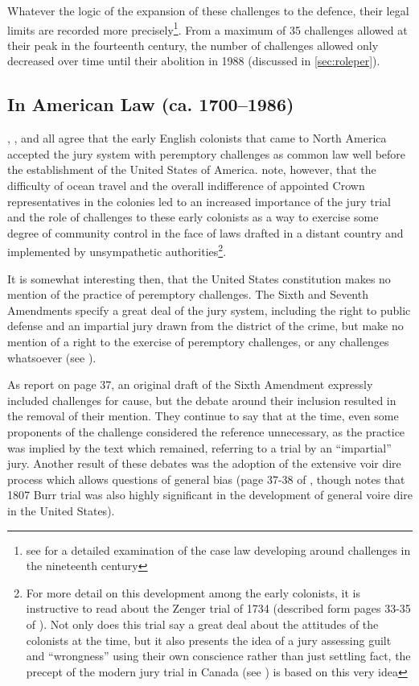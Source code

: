 Whatever the logic of the expansion of these challenges to the defence, their legal limits are recorded more
precisely\footnote{see \cite{brown2000} for a detailed examination of the case law developing around challenges in the nineteenth
  century}. From a maximum of 35 challenges allowed at their peak in the fourteenth century, the number of challenges allowed only
decreased over time until their abolition in 1988 (discussed in \ref{sec:roleper}).

\subsection{In American Law (ca. 1700--1986)}

\cite{vonmosch1921}, \cite{hoffman1997}, and \cite{vandykejurysel} all agree that the early English colonists that came to North
America accepted the jury system with peremptory challenges as common law well before the establishment of the United States of
America. \cite{hansvidjudging} note, however, that the difficulty of ocean travel and the overall indifference of appointed Crown
representatives in the colonies led to an increased importance of the jury trial and the role of challenges to these early
colonists as a way to exercise some degree of community control in the face of laws drafted in a distant country and implemented
by unsympathetic authorities\footnote{For more detail on this development among the early colonists, it is instructive to read
  about the Zenger trial of 1734 (described form pages 33-35 of \cite{hansvidjudging}). Not only does this trial say a great deal
  about the attitudes of the colonists at the time, but it also presents the idea of a jury assessing guilt and ``wrongness''
  using their own conscience rather than just settling fact, the precept of the modern jury trial in Canada (see
  \cite{woolley2018}) is based on this very idea}.

It is somewhat interesting then, that the United States constitution makes no mention of the practice of peremptory
challenges. The Sixth and Seventh Amendments specify a great deal of the jury system, including the right to public defense and an
impartial jury drawn from the district of the crime, but make no mention of a right to the exercise of peremptory challenges, or
any challenges whatsoever (see \cite{usconstitution}).

As \cite{hansvidjudging} report on page 37, an original draft of the Sixth Amendment expressly included challenges for cause, but
the debate around their inclusion resulted in the removal of their mention. They continue to say that at the time, even some
proponents of the challenge considered the reference unnecessary, as the practice was implied by the text which remained,
referring to a trial by an ``impartial'' jury. Another result of these debates was the adoption of the extensive voir dire process
which allows questions of general bias (page 37-38 of \cite{hansvidjudging}, though \cite{brown2000} notes that 1807 Burr trial
was also highly significant in the development of general voire dire in the United States).

